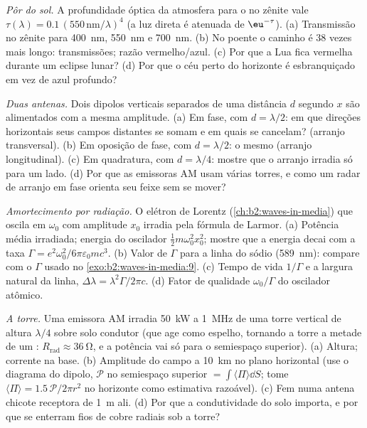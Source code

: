 \begin{exercise}[$\star\star$]\label{exo:b2:dipole-radiation:8}
\emph{Pôr do sol.} A profundidade óptica da atmosfera para o  no zênite vale $\tau(\lambda) = 0.1\,(550\,\text{nm}/\lambda)^4$ (a
luz direta é atenuada de $\eu^{-\tau}$). (a) Transmissão no
zênite para \qty{400}{nm}, \qty{550}{nm} e \qty{700}{nm}. (b) No poente o caminho
é $38$ vezes mais longo: transmissões; razão vermelho/azul. (c) Por que a
Lua fica vermelha durante um eclipse lunar? (d) Por que o céu perto do
horizonte é esbranquiçado em vez de azul profundo?
\end{exercise}

\begin{exercise}[$\star\star$]\label{exo:b2:dipole-radiation:9}
\emph{Duas antenas.} Dois dipolos verticais separados de uma distância $d$ segundo
$x$ são alimentados com a mesma amplitude. (a) Em fase, com $d = \lambda/2$: em que
direções horizontais seus campos distantes se somam e em quais se cancelam?
(arranjo transversal). (b) Em oposição de fase, com $d = \lambda/2$: o mesmo (arranjo longitudinal).
(c) Em quadratura, com $d = \lambda/4$: mostre que o arranjo irradia só para um
lado. (d) Por que as emissoras AM usam várias torres, e
como um radar de arranjo em fase orienta seu feixe sem se mover?
\end{exercise}

\begin{exercise}[$\star\star\star$]\label{exo:b2:dipole-radiation:10}
\emph{Amortecimento por radiação.} O elétron de Lorentz (\cref{ch:b2:waves-in-media})
que oscila em $\omega_0$ com amplitude $x_0$ irradia pela fórmula de Larmor.
(a) Potência média irradiada; energia do oscilador $\tfrac12m\omega_0^2x_0^2$;
mostre que a energia decai com a taxa $\Gamma = e^2\omega_0^2/6\pi\varepsilon_0mc^3$.
(b) Valor de $\Gamma$ para a linha do sódio (\qty{589}{nm}): compare com o
$\Gamma$ usado no \cref{exo:b2:waves-in-media:9}. (c) Tempo de vida $1/\Gamma$ e a
largura natural da linha, $\Delta\lambda = \lambda^2\Gamma/2\pi c$. (d) Fator de qualidade
$\omega_0/\Gamma$ do oscilador atômico.
\end{exercise}

\begin{exercise}[$\star\star\star$]\label{exo:b2:dipole-radiation:11}
\emph{A torre.} Uma emissora AM irradia \qty{50}{kW} a \qty{1}{MHz} de uma
torre vertical de altura $\lambda/4$ sobre solo condutor (que age como
espelho, tornando a torre a metade de um : $R_{\text{rad}} \approx
\qty{36}{\ohm}$, e a potência vai só para o semiespaço superior). (a)
Altura; corrente na base. (b) Amplitude do campo a \qty{10}{km} no
plano horizontal (use o diagrama do dipolo, $\mathcal P$ no semiespaço
superior $= \int\langle\Pi\rangle\dd S$; tome $\langle\Pi\rangle = 1.5\,
\mathcal P/2\pi r^2$ no horizonte como estimativa razoável). (c) Fem numa
antena chicote receptora de \qty{1}{m} ali. (d) Por que a condutividade do solo
importa, e por que se enterram fios de cobre radiais sob a torre?
\end{exercise}

